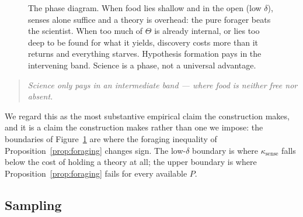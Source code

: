 \documentclass[11pt]{article}
\theoremstyle{plain}
\theoremstyle{definition}
\begin{document}
\begin{figure}[t]
\centering
{}
\caption{The phase diagram. When food lies shallow and in the open (low $\delta$), senses alone
suffice and a theory is overhead: the pure forager beats the scientist. When too much of $\Theta$ is
already internal, or lies too deep to be found for what it yields, discovery costs more than it
returns and everything starves. Hypothesis formation pays in the intervening band. Science is a phase,
not a universal advantage.}
\label{fig:phase}
\end{figure}

\begin{quote}
\itshape Science only pays in an intermediate band --- where food is neither free nor absent.
\end{quote}

We regard this as the most substantive empirical claim the construction makes, and it is a claim the
construction makes rather than one we impose: the boundaries of Figure~\ref{fig:phase} are where the
foraging inequality of Proposition~\ref{prop:foraging} changes sign. The low-$\delta$ boundary is
where $\kappa_{\mathrm{sense}}$ falls below the cost of holding a theory at all; the upper boundary is
where Proposition~\ref{prop:foraging} fails for every available $P$.

\subsection{Sampling}
\end{document}

